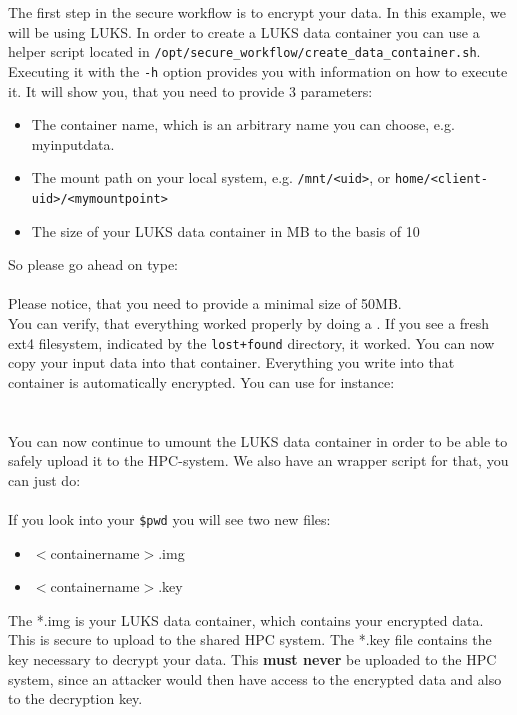 \documentclass[paper=a4]{scrartcl}
\begin{document}
The first step in the secure workflow is to encrypt your data. 
In this example, we will be using LUKS. 
In order to create a LUKS data container you can use a helper script located in \texttt{/opt/secure\_workflow/create\_data\_container.sh}. 
Executing it with the \texttt{-h} option provides you with information on how to execute it. 
It will show you, that you need to provide 3 parameters: 
\begin{itemize}
	\item The container name, which is an arbitrary name you can choose, e.g. myinputdata.
	\item The mount path on your local system, e.g. \texttt{/mnt/<uid>}, or \texttt{home/<client-uid>/<mymountpoint>}
	\item The size of your LUKS data container in MB to the basis of 10
\end{itemize}
So please go ahead on type: \\
 \\
Please notice, that you need to provide a minimal size of 50MB. \\
You can verify, that everything worked properly by doing a . 
If you see a fresh ext4 filesystem, indicated by the \texttt{lost+found} directory, it worked. 
You can now copy your input data into that container. 
Everything you write into that container is automatically encrypted. 
You can use for instance: \\
 \\
\\
You can now continue to umount the LUKS data container in order to be able to safely upload it to the HPC-system. 
We also have an wrapper script for that, you can just do: \\
\\
If you look into your \texttt{\$pwd} you will see two new files:
\begin{itemize}
	\item $<$containername$>$.img
	\item $<$containername$>$.key
\end{itemize}
The *.img is your LUKS data container, which contains your encrypted data. This is secure to upload to the shared HPC system. 
The *.key file contains the key necessary to decrypt your data. This \textbf{must never} be uploaded to the HPC system, since an attacker would then have access to the encrypted data and also to the decryption key. 
\end{document}
